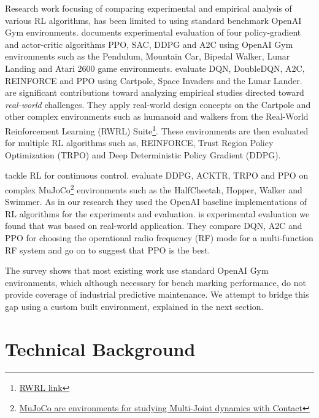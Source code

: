 \documentclass[a4paper, 12pt]{article}
\begin{document}
Research work focusing of comparing experimental and empirical analysis of various RL algorithms, has been limited to using standard benchmark OpenAI Gym environments. \cite{sandeep2022experimental} documents experimental evaluation of four policy-gradient and actor-critic algorithms PPO, SAC, DDPG and A2C using OpenAI Gym environments such as the Pendulum, Mountain Car, Bipedal Walker, Lunar Landing and Atari 2600 game environments. \cite{Krishna2020} evaluate DQN, DoubleDQN, A2C, REINFORCE and PPO using Cartpole, Space Invaders and the Lunar Lander. \cite{dulac2021, dulac2020empirical} are significant contributions toward analyzing empirical studies directed toward \textit{real-world} challenges. They apply real-world design concepts on the Cartpole and other complex environments such as humanoid and walkers from the Real-World Reinforcement Learning (RWRL) Suite\footnote{\href{https://github.com/google-research/realworldrl_suite}{RWRL link}}. These environments are then evaluated for multiple RL algorithms such as, REINFORCE, Trust Region Policy Optimization (TRPO) and Deep Deterministic Policy Gradient (DDPG). 

\cite{dulac2021, henderson2018deep} tackle RL for continuous control. \cite{henderson2018deep} evaluate DDPG, ACKTR, TRPO and PPO on complex MuJoCo\footnote{\href{https://mujoco.org/}{MuJoCo are environments for studying Multi-Joint dynamics with Contact}} environments such as the HalfCheetah, Hopper, Walker and Swimmer. As in our research they used the OpenAI baseline implementations of RL algorithms for the experiments and evaluation. \cite{ford2022cognitive} is experimental evaluation we found that was based on real-world application. They compare DQN, A2C and PPO for choosing the operational radio frequency (RF) mode for a multi-function RF system and go on to suggest that PPO is the best.

The survey shows that most existing work use standard OpenAI Gym environments, which although necessary for bench marking performance, do not provide coverage of industrial predictive maintenance. We attempt to bridge this gap using a custom built environment, explained in the next section. 

\section{Technical Background}\label{sec:Background}
\end{document}
